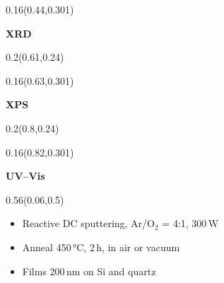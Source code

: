 \documentclass[aspectratio=169]{beamer}
\begin{document}
\begin{frame}[t]
\begin{textblock}{0.16}(0.44,0.301)
{\centering\fontsize{11}{13}\selectfont \textcolor[HTML]{FFFFFF}{\textbf{XRD}}\par}
\end{textblock}

%
\begin{textblock}{0.2}(0.61,0.24)
\end{textblock}

\begin{textblock}{0.16}(0.63,0.301)
{\centering\fontsize{11}{13}\selectfont \textcolor[HTML]{FFFFFF}{\textbf{XPS}}\par}
\end{textblock}

%
\begin{textblock}{0.2}(0.8,0.24)
\end{textblock}

\begin{textblock}{0.16}(0.82,0.301)
{\centering\fontsize{11}{13}\selectfont \textcolor[HTML]{FFFFFF}{\textbf{UV–Vis}}\par}
\end{textblock}

\begin{textblock}{0.56}(0.06,0.5)
{\raggedright\fontsize{15}{18}\selectfont \begin{itemize}
\item Reactive DC sputtering, Ar/O$_2$ = 4:1, 300\,W
\item Anneal 450\,°C, 2\,h, in air or vacuum
\item Films 200\,nm on Si and quartz
\end{itemize}\par}
\end{textblock}


\end{frame}
\end{document}
